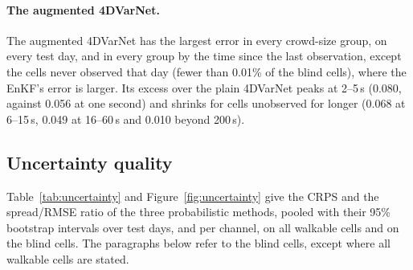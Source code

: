 \documentclass[english, 12pt, a4paper, elec, utf8, a-2b, online]{aaltothesis}
\begin{document}
\paragraph{The augmented 4DVarNet.}
The augmented 4DVarNet has the largest error in every crowd-size group, on
every test day, and in every group by the time since the last observation,
except the cells never observed that day (fewer than 0.01\% of the blind cells), where the EnKF's error is larger.
Its excess over the plain 4DVarNet peaks at 2--5\,s (0.080, against 0.056 at one
second) and shrinks for cells unobserved for longer (0.068 at 6--15\,s, 0.049 at
16--60\,s and 0.010 beyond 200\,s).

\subsection{Uncertainty quality}
\label{sec:res_unc}

Table~\ref{tab:uncertainty} and Figure~\ref{fig:uncertainty} give the CRPS and
the spread/RMSE ratio of the three probabilistic methods, pooled with their 95\%
bootstrap intervals over test days, and per channel, on all walkable cells and
on the blind cells. The paragraphs below refer to the blind cells, except where
all walkable cells are stated.
\end{document}
